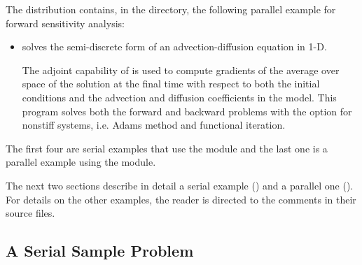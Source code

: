 The {\cvodes} distribution contains, in the 
directory, the following parallel example for forward sensitivity analysis:

\begin{itemize}
\item {}
  solves the semi-discrete form of an advection-diffusion equation in 1-D.

  The adjoint capability of {\cvodes} is used to compute gradients
  of the average over space of the solution at the final time with
  respect to both the initial conditions and the advection and
  diffusion coefficients in the model.
  This program solves both the forward and backward problems with the option 
  for nonstiff systems, i.e. Adams method and functional iteration.
\end{itemize}
The first four are serial examples that use the {\nvecs} module and
the last one is a parallel example using the {\nvecp} module.

The next two sections describe in detail a serial example () and
a parallel one (). For details on the other examples, the reader is
directed to the comments in their source files.

\subsection{A Serial Sample Problem}\label{ss:serial_adj_ex}


